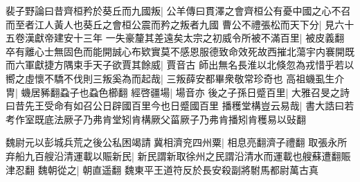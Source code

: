 裴子野論曰昔齊桓矜於葵丘而九國叛|{
	公羊傳曰貫澤之會齊桓公有憂中國之心不召而至者江人黃人也葵丘之會桓公震而矜之叛者九國}
曹公不禮張松而天下分|{
	見六十五卷漢獻帝建安十三年}
一失豪釐其差遠矣太宗之初威令所被不滿百里|{
	被皮義翻}
卒有離心士無固色而能開誠心布欵實莫不感恩服德致命效死故西摧北蕩宇内褰開既而六軍獻捷方隅束手天子欲賈其餘威|{
	賈音古}
師出無名長淮以北倏忽為戎惜乎若以嚮之虛懷不驕不伐則三叛奚為而起哉|{
	三叛薛安都畢衆敬常珍奇也}
高祖蟣虱生介冑|{
	蟣居豨翻蝨子也蝨色櫛翻}
經啓疆場|{
	場音亦}
後之子孫日蹙百里|{
	大雅召旻之詩曰昔先王受命有如召公日辟國百里今也日蹙國百里}
播穫堂構豈云易哉|{
	書大誥曰若考作室既底法厥子乃弗肯堂矧肯構厥父菑厥子乃弗肯播矧肯穫易以䜴翻}


魏尉元以彭城兵荒之後公私困竭請冀相濟兖四州粟|{
	相息亮翻濟子禮翻}
取張永所弃船九百艘沿清運載以賑新民|{
	新民謂新取徐州之民謂沿清水而運載也艘蘇遭翻賑津忍翻}
魏朝從之|{
	朝直遥翻}
魏東平王道符反於長安殺副將駙馬都尉萬古真

